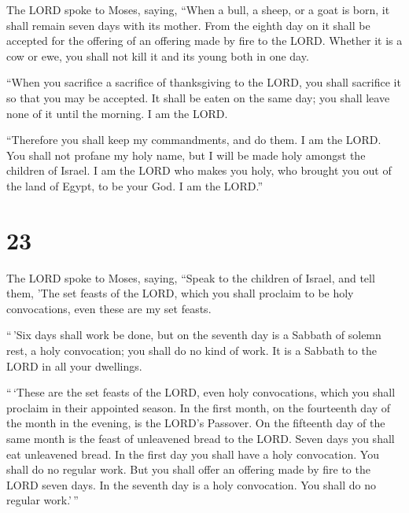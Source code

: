  The LORD spoke to Moses, saying,  ``When
a bull, a sheep, or a goat is born, it shall remain seven days with its
mother. From the eighth day on it shall be accepted for the offering of
an offering made by fire to the LORD.  Whether it is a
cow or ewe, you shall not kill it and its young both in one day.

 ``When you sacrifice a sacrifice of thanksgiving to the
LORD, you shall sacrifice it so that you may be accepted.
 It shall be eaten on the same day; you shall leave none
of it until the morning. I am the LORD.

 ``Therefore you shall keep my commandments, and do them.
I am the LORD.  You shall not profane my holy name, but I
will be made holy amongst the children of Israel. I am the LORD who
makes you holy,  who brought you out of the land of
Egypt, to be your God. I am the LORD.''

\hypertarget{section-22}{%
\section{23}\label{section-22}}

 The LORD spoke to Moses, saying,  ``Speak
to the children of Israel, and tell them, 'The set feasts of the LORD,
which you shall proclaim to be holy convocations, even these are my set
feasts.

 ``\,'Six days shall work be done, but on the seventh day
is a Sabbath of solemn rest, a holy convocation; you shall do no kind of
work. It is a Sabbath to the LORD in all your dwellings.

 ``\,`These are the set feasts of the LORD, even holy
convocations, which you shall proclaim in their appointed season.
 In the first month, on the fourteenth day of the month in
the evening, is the LORD's Passover.  On the fifteenth day
of the same month is the feast of unleavened bread to the LORD. Seven
days you shall eat unleavened bread.  In the first day you
shall have a holy convocation. You shall do no regular work.
 But you shall offer an offering made by fire to the LORD
seven days. In the seventh day is a holy convocation. You shall do no
regular work.'\,''

